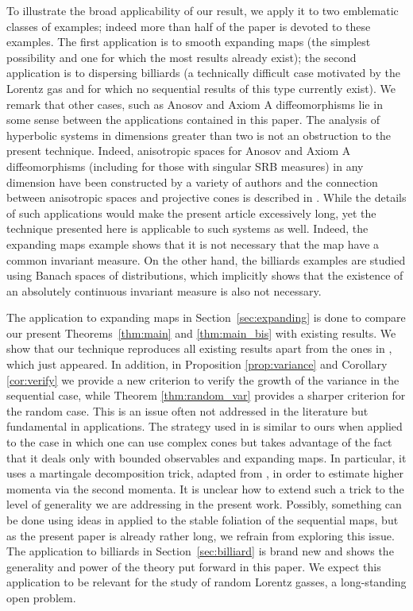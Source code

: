 \documentclass{amsart}
\numberwithin{equation}{section}
\begin{document}
To illustrate the broad applicability of our result, we apply it to two emblematic classes of examples; indeed more than half of the paper is devoted to these examples. The first application is to smooth expanding maps 
(the simplest possibility and one for which the most results already exist); the second application is to dispersing billiards (a technically difficult case motivated by the Lorentz gas and for which no sequential results of this type currently exist).  We remark that other cases, such as Anosov and Axiom A diffeomorphisms lie in some sense between the applications contained in this paper.  The analysis of hyperbolic systems in dimensions greater than two is not an obstruction to the present technique.  Indeed, anisotropic spaces for Anosov and Axiom A diffeomorphisms (including for those with singular SRB measures) in any dimension have been constructed by a variety of authors \cite{GL1, BT1, GL2} and the connection between anisotropic spaces and projective cones is described in \cite{DKL}.  While the details of such applications would make the present article excessively long, yet the
technique presented here is applicable to such systems as well.  Indeed, the expanding maps example shows that it is not necessary that the map have a common invariant measure. On the other hand, the billiards examples are studied using Banach spaces of distributions, which implicitly shows that the existence of an absolutely continuous invariant measure is also not necessary.

The application to expanding maps in Section~\ref{sec:expanding} is done to compare our present 
Theorems~\ref{thm:main} and \ref{thm:main_bis} with existing results. We show that our technique reproduces all existing 
results apart from the ones in \cite{DH24}, which just appeared. In addition, in Proposition \ref{prop:variance} and Corollary \ref{cor:verify} we provide a new criterion to verify the growth of the variance in the sequential case, while Theorem \ref{thm:random_var} provides a sharper criterion for the random case. This is an issue often not addressed in the literature but fundamental in applications.  The strategy used in \cite{DH24} is similar to ours when applied to the case in which one can use complex cones but takes advantage of the fact that it deals only with bounded observables and expanding maps. In particular, it uses a martingale decomposition trick, adapted from \cite[Chapter 3]{Merlevede}, in order to estimate higher momenta via the second momenta. It is unclear how to extend such a trick to the level of generality we are addressing in the present work.  Possibly, something can be done using ideas in \cite[Theorem 1.2]{Li95c} applied to the stable foliation of the sequential maps, but as the present paper is already rather long, we refrain from exploring this issue.
The application to billiards in Section~\ref{sec:billiard} is brand new and shows the generality and power of the theory put forward in this paper. We expect this application to be relevant for the study of random Lorentz gasses, a long-standing open problem.
\end{document}
